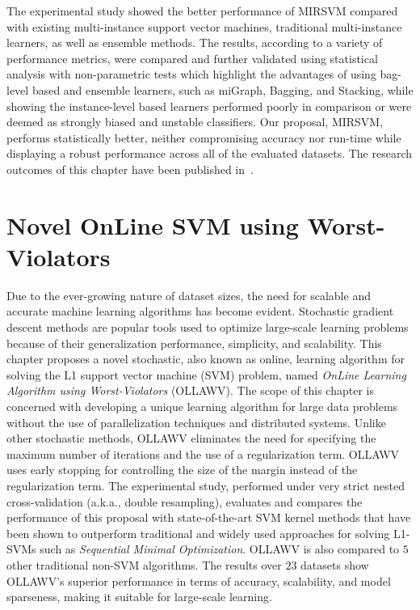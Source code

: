 \documentclass[reqno]{vcuthesis}
\numberwithin{equation}{chapter}
\begin{document}
The experimental study showed the better performance of MIRSVM compared with existing multi-instance support vector machines, traditional multi-instance learners, as well as ensemble methods. The results, according to a variety of performance metrics, were compared and further validated using statistical analysis with non-parametric tests which highlight the advantages of using bag-level based and ensemble learners, such as miGraph, Bagging, and Stacking, while showing the instance-level based learners performed poorly in comparison or were deemed as strongly biased and unstable classifiers. Our proposal, MIRSVM, performs statistically better, neither compromising accuracy nor run-time while displaying a robust performance across all of the evaluated datasets. The research outcomes of this chapter have been published in~\cite{melki2018mirsvm}.

\chapter{Novel OnLine SVM using Worst-Violators}
Due to the ever-growing nature of dataset sizes, the need for scalable and accurate machine learning algorithms has become evident. Stochastic gradient descent methods are popular tools used to optimize large-scale learning problems because of their generalization performance, simplicity, and scalability. This chapter proposes a novel stochastic, also known as online, learning algorithm for solving the L1 support vector machine (SVM) problem, named \textit{OnLine Learning Algorithm using Worst-Violators} (OLLAWV). The scope of this chapter is concerned with developing a unique learning algorithm for large data problems without the use of parallelization techniques and distributed systems. Unlike other stochastic methods, OLLAWV eliminates the need for specifying the maximum number of iterations and the use of a regularization term. OLLAWV uses early stopping for controlling the size of the margin instead of the regularization term. The experimental study, performed under very strict nested cross-validation (a.k.a., double resampling), evaluates and compares the performance of this proposal with state-of-the-art SVM kernel methods that have been shown to outperform traditional and widely used approaches for solving L1-SVMs such as \textit{Sequential Minimal Optimization}. OLLAWV is also compared to $5$ other traditional non-SVM algorithms. The results over $23$ datasets show OLLAWV's superior performance in terms of accuracy, scalability, and model sparseness, making it suitable for large-scale learning.
\end{document}
